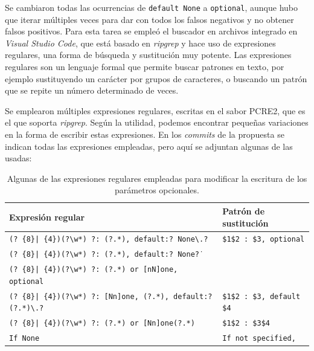 Se cambiaron todas las ocurrencias de \texttt{default None} a \texttt{optional}, aunque hubo que iterar múltiples veces para dar con todos los falsos negativos y no obtener falsos positivos. Para esta tarea se empleó el buscador en archivos integrado en \textit{Visual Studio Code}, que está basado en \textit{ripgrep} y hace uso de expresiones regulares, una forma de búsqueda y sustitución muy potente. Las expresiones regulares son un lenguaje formal que permite buscar patrones en texto, por ejemplo sustituyendo un carácter por grupos de caracteres, o buscando un patrón que se repite un número determinado de veces.

Se emplearon múltiples expresiones regulares, escritas en el sabor PCRE2, que es el que soporta \textit{ripgrep}. Según la utilidad, podemos encontrar pequeñas variaciones en la forma de escribir estas expresiones. En los \textit{commits} de la propuesta se indican todas las expresiones empleadas, pero aquí se adjuntan algunas de las usadas:

\begin{table}[H]
    \centering
    \begin{adjustbox}{max width=\textwidth}
    \begin{tabular}{l|l}
        Expresión regular & Patrón de sustitución \\
        \hline
        \texttt{(? \{8\}| \{4\})(?\textbackslash{}w*) ?: (?.*), default:? None\textbackslash{}.?} & \texttt{\$1\$2 : \$3, optional} \\
        \texttt{(? \{8\}| \{4\})(?\textbackslash{}w*) ?: (?.*), default:? None\.?} & \\
        \texttt{(? \{8\}| \{4\})(?\textbackslash{}w*) ?: (?.*) or {[}nN{]}one, optional} & \\
        \hline
        \texttt{(? \{8\}| \{4\})(?\textbackslash{}w*) ?: {[}Nn{]}one, (?.*), default:? (?.*)\textbackslash{}.?} & \texttt{\$1\$2 : \$3, default \$4} \\
        \hline
        \texttt{(? \{8\}| \{4\})(?\textbackslash{}w*) ?: (?.*) or {[}Nn{]}one(?.*)} & \texttt{\$1\$2 : \$3\$4} \\
        \hline
        \texttt{If None} & \texttt{If not specified,} \\
    \end{tabular}
    \end{adjustbox}
    \caption{Algunas de las expresiones regulares empleadas para modificar la escritura de los parámetros opcionales.}
    \label{tab:expresiones_regulares_default_none}
\end{table}

